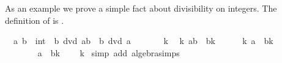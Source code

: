 \begin{isabellebody}
\begin{isamarkuptext}
As an example we prove a simple fact about divisibility on integers.
The definition of  is .
\end{isamarkuptext}%
\isamarkupfalse%
\ \ a\ b\ {}{}\ int\ \ {}b\ dvd\ {}a{}b{}{}\ \ {}b\ dvd\ a{}\isanewline
%
\isadelimproof
%
\endisadelimproof
%
\isatagproof
{}\isamarkupfalse%
\ {}\isanewline
\ \ \isamarkupfalse%
\ \isamarkupfalse%
\ k\ \isamarkupfalse%
\ k{}\ {}a{}b\ {}\ b{}k{}\isanewline
\ \ \ \ \isamarkupfalse%
\ {}{}k{}{}\ a\ {}\ b{}k{}{}\isanewline
\ \ \ \ \isamarkupfalse%
\isanewline
\ \ \ \ \ \ \isamarkupfalse%
\ {}a\ {}\ b{}{}k\ {}\ {}{}{}\ \isamarkupfalse%
\ k\ \isamarkupfalse%
{}simp\ add{}\ algebra{}simps{}\isanewline
\ \ \ \ \isamarkupfalse%
\ \isamarkupfalse%

\end{isabellebody}
